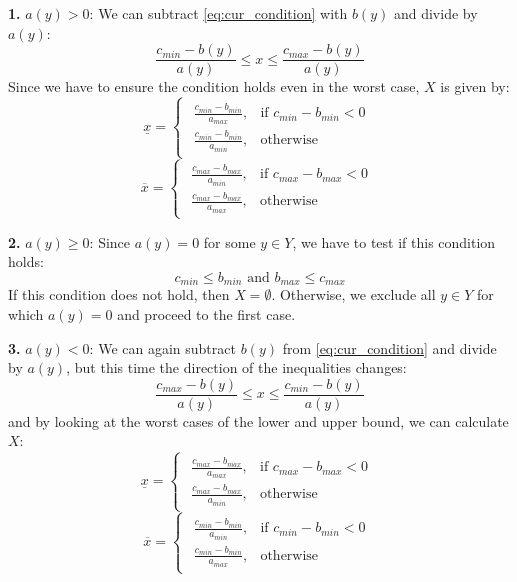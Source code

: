\textbf{1.
}
$a(y) > 0$:
We can subtract \eqref{eq:cur_condition} with $b(y)$ and divide by $a(y)$:
\[
	\frac{c_{min}-b(y)}{a(y)} \leq x \leq \frac{c_{max}-b(y)}{a(y)}
\]
Since we have to ensure the condition holds even in the worst case, $X$ is given by:
\[
	\underline{x} =
	\begin{cases}
		\begin{array}{ll}
			\frac{c_{min}-b_{min}}{a_{max}}, & \text{if } c_{min}-b_{min} < 0 \\[10pt]
			\frac{c_{min}-b_{min}}{a_{min}}, & \text{otherwise}
		\end{array}
	\end{cases}
\]
\[
	\overline{x} =
	\begin{cases}
		\begin{array}{ll}
			\frac{c_{max}-b_{max}}{a_{min}}, & \text{if } c_{max}-b_{max} < 0 \\[10pt]
			\frac{c_{max}-b_{max}}{a_{max}}, & \text{otherwise}
		\end{array}
	\end{cases}
\]

\textbf{2.}
$a(y) \geq 0$:
Since $a(y) = 0$ for some $y\in Y$, we have to test if this condition holds:
\[
	c_{min} \leq b_{min} \text{ and } b_{max} \leq c_{max}
\]
If this condition does not hold, then $X=\emptyset$.
Otherwise, we exclude all $y \in Y$ for which $a(y)=0$ and proceed to the first case.

\textbf{3.}
$a(y) < 0$:
We can again subtract $b(y)$ from \eqref{eq:cur_condition} and divide by $a(y)$, but this time the direction of the inequalities changes:
\[
	\frac{c_{max}-b(y)}{a(y)} \leq x \leq \frac{c_{min}-b(y)}{a(y)}
\]
and by looking at the worst cases of the lower and upper bound, we can calculate $X$:
\[
	\underline{x} =
	\begin{cases}
		\begin{array}{ll}
			\frac{c_{max}-b_{max}}{a_{max}}, & \text{if } c_{max}-b_{max} < 0 \\[10pt]
			\frac{c_{max}-b_{max}}{a_{min}}, & \text{otherwise}
		\end{array}
	\end{cases}
\]
\[
	\overline{x} =
	\begin{cases}
		\begin{array}{ll}
			\frac{c_{min}-b_{min}}{a_{min}}, & \text{if } c_{min}-b_{min} < 0 \\[10pt]
			\frac{c_{min}-b_{min}}{a_{max}}, & \text{otherwise}
		\end{array}
	\end{cases}
\]

